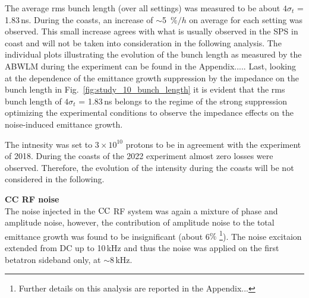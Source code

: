 
The average rms bunch length (over all settings) was measured to be about $4\sigma_t$ = 1.83\,ns. During the coasts, an increase of $\sim$5~$\%/h$ on average for each setting was observed. This small increase agrees with what is usually observed in the SPS in coast and will not be taken into consideration in the following analysis. The individual plots illustrating the evolution of the bunch length as measured by the ABWLM during the experiment can be found in the Appendix..... Last, looking at the dependence of the emittance growth suppression by the impedance on the bunch length in Fig.~\ref{fig:study_10_bunch_length} it is evident that the rms bunch length of $4\sigma_t$ = 1.83\,ns belongs to the regime of the strong suppression optimizing the experimental conditions to observe the impedance effects on the noise-induced emittance growth.

The intnesity was set to $3 \times 10^{10}$ protons to be in agreement with the experiment of 2018. During the coasts of the 2022 experiment almost zero losses were observed. Therefore, the evolution of the intensity during the coasts will be not considered in the following.


\textbf{CC RF noise}\\
The noise injected in the ${\mathrm{CC}}$ RF system was again a mixture of phase and amplitude noise, however, the contribution of amplitude noise to the total emittance growth was found to be insignificant (about 6$\%$ \footnote{Further details on this analysis are reported in the Appendix...}). The noise excitaion extended from DC up to 10\,kHz and thus the noise was applied on the first betatron sideband only, at $\sim$8\,kHz.



